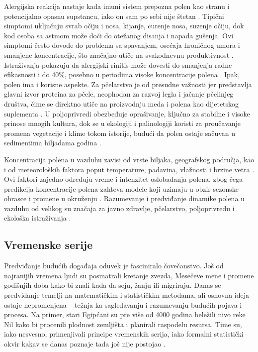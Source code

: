 \documentclass[12pt]{article}
\begin{document}
Alergijska reakcija nastaje kada imuni sistem prepozna polen kao stranu i potencijalno opasnu supstancu, iako on sam po sebi nije štetan \cite{bionette2023}. Tipični simptomi uključuju svrab očiju i nosa, kijanje, curenje nosa, suzenje očiju, dok kod osoba sa astmom može doći do otežanog disanja i napada gušenja. Ovi simptomi često dovode do problema sa spavanjem, osećaja hroničnog umora i smanjene koncentracije, što značajno utiče na svakodnevnu produktivnost \cite{minic2020}. Istraživanja pokazuju da alergijski rinitis može dovesti do smanjenja radne efikasnosti i do 40\%, posebno u periodima visoke koncentracije polena \cite{sofia2023}.
Ipak, polen ima i korisne aspekte. Za pčelarstvo je od presudne važnosti jer predstavlja glavni izvor proteina za pčele, neophodan za razvoj legla i jačanje pčelinjeg društva, čime se direktno utiče na proizvodnju meda i polena kao dijetetskog suplementa \cite{pollenBio2021}. U poljoprivredi obezbeđuje oprašivanje, ključno za stabilne i visoke prinose mnogih kultura, dok se u ekologiji i palinologiji koristi za proučavanje promena vegetacije i klime tokom istorije, budući da polen ostaje sačuvan u sedimentima hiljadama godina \cite{piotrowska2012}.

Koncentracija polena u vazduhu zavisi od vrste biljaka, geografskog područja, kao i od meteoroloških faktora poput temperature, padavina, vlažnosti i brzine vetra \cite{chico2025}. Ovi faktori zajedno određuju vreme i intenzitet oslobađanja polena, zbog čega predikcija koncentracije polena zahteva modele koji uzimaju u obzir sezonske obrasce i promene u okruženju \cite{sofia2023}. Razumevanje i predviđanje dinamike polena u vazduhu od velikog su značaja za javno zdravlje, pčelarstvo, poljoprivredu i ekološka istraživanja \cite{minic2020}.

\subsection{Vremenske serije}
Predviđanje budućih događaja oduvek je fasciniralo čovečanstvo. Još od najranijih vremena ljudi su posmatrali kretanje zvezda, Mesečeve mene i promene godišnjih doba kako bi znali kada da seju, žanju ili migriraju. Danas se predviđanje temelji na matematičkim i statističkim metodama, ali osnovna ideja ostaje nepromenjena – težnja ka sagledavanju i razumevanju budućih pojava i procesa. Na primer, stari Egipćani su pre više od 4000 godina beležili nivo reke Nil kako bi procenili plodnost zemljišta i planirali raspodelu resursa. Time su, iako nesvesno, primenjivali principe vremenskih serija, iako formalni statistički okvir kakav se danas poznaje tada još nije postojao \cite{metnil2025}.
\end{document}
